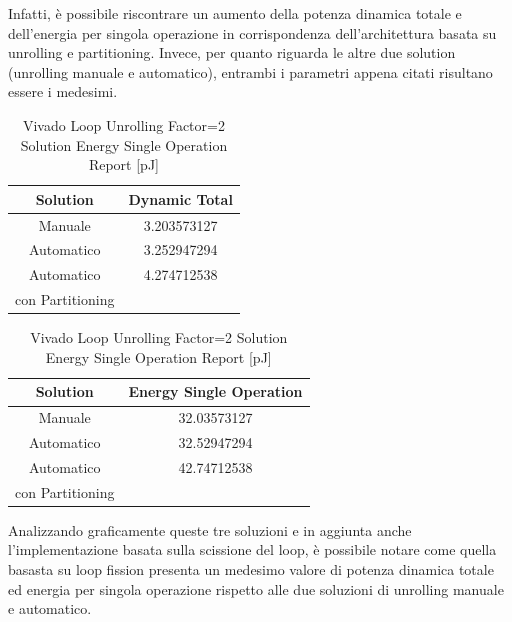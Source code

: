 Infatti, è possibile riscontrare un aumento della potenza dinamica totale e dell'energia per singola operazione in corrispondenza dell'architettura basata su unrolling e partitioning. Invece, per quanto riguarda le altre due solution (unrolling manuale e automatico), entrambi i parametri appena citati risultano essere i medesimi. 

\begin{table}[H]
    \centering
    \begin{minipage}[t]{0.45\linewidth}
        \centering
        \begin{tabular}{|c|c|}
            \hline
            \textbf{Solution} & \textbf{Dynamic Total} \\
            \hline
            Manuale & 3.203573127 \\
            \hline
            Automatico & 3.252947294 \\
            \hline
            Automatico & 4.274712538 \\
            con Partitioning & \\
            \hline
        \end{tabular}
        \caption{Vivado Loop Unrolling Factor=2 Solution Dynamic Power Report [mW]}
        \label{tab:vivado-loop-unrolling-factor2-solution-dynamic-power-reproot}
    \end{minipage}
    \hfill
    \centering
    \begin{minipage}[t]{0.45\linewidth}
        \centering
        \begin{tabular}{|c|c|}
            \hline
            \textbf{Solution} & \textbf{Energy Single Operation} \\
            \hline
            Manuale & 32.03573127 \\
            \hline
            Automatico & 32.52947294 \\
            \hline
            Automatico & 42.74712538 \\
            con Partitioning & \\
            \hline
        \end{tabular}
        \caption{Vivado Loop Unrolling Factor=2 Solution Energy Single Operation Report [pJ]}
        \label{tab:vivado-loop-unrolling-factor2-solution-solution-energy-single-operation-reproot}
    \end{minipage}
\end{table}

Analizzando graficamente queste tre soluzioni e in aggiunta anche l'implementazione basata sulla scissione del loop, è possibile notare come quella basasta su loop fission presenta un medesimo valore di potenza dinamica totale ed energia per singola operazione rispetto alle due soluzioni di unrolling manuale e automatico.


